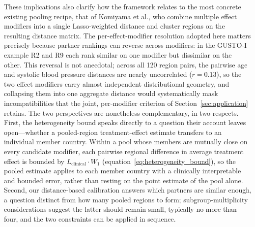 \documentclass[AMA,Times1COL]{WileyNJDv5}
\begin{document}
These implications also clarify how the framework relates to the most concrete existing pooling recipe, that of Komiyama et al., who combine multiple effect modifiers into a single Lasso-weighted distance and cluster regions on the resulting distance matrix.\cite{komiyama2024} The per-effect-modifier resolution adopted here matters precisely because partner rankings can reverse across modifiers: in the GUSTO-I example R2 and R9 each rank similar on one modifier but dissimilar on the other. This reversal is not anecdotal; across all 120 region pairs, the pairwise age and systolic blood pressure distances are nearly uncorrelated ($r = 0.13$), so the two effect modifiers carry almost independent distributional geometry, and collapsing them into one aggregate distance would systematically mask incompatibilities that the joint, per-modifier criterion of Section~\ref{sec:application} retains. The two perspectives are nonetheless complementary, in two respects. First, the heterogeneity bound speaks directly to a question their account leaves open---whether a pooled-region treatment-effect estimate transfers to an individual member country. Within a pool whose members are mutually close on every candidate modifier, each pairwise regional difference in average treatment effect is bounded by $L_{\text{clinical}} \cdot W_1$ (equation~\ref{eq:heterogeneity_bound}), so the pooled estimate applies to each member country with a clinically interpretable and bounded error, rather than resting on the point estimate of the pool alone. Second, our distance-based calibration answers which partners are similar enough, a question distinct from how many pooled regions to form; subgroup-multiplicity considerations suggest the latter should remain small, typically no more than four,\cite{komiyama2024,quan2010} and the two constraints can be applied in sequence.
\end{document}
